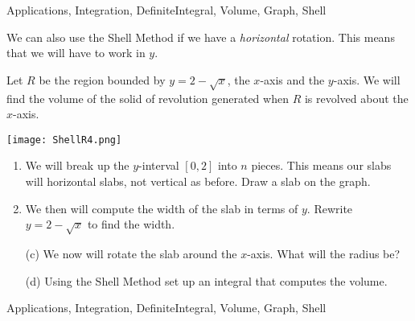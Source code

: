\begin{tagblock}{Applications, Integration, DefiniteIntegral, Volume, Graph, Shell}
\begin{question}
	


We can also use the Shell Method if we have a \emph{horizontal} rotation.  This means that we will have to work in $y$.
 
 \item Let $R$ be the region bounded by $y=2-\sqrt{x}$, the $x$-axis and the $y$-axis.  We will find the volume of the  solid of revolution generated when $R$ is revolved about the $x$-axis. 

\begin{minipage}{.4\textwidth} \texttt{[image: ShellR4.png]} \end{minipage}%
 \begin{minipage}{.6\textwidth}
\begin{enumerate}
\item We will break up the $y$-interval $[0,2]$ into $n$ pieces.  This means our slabs will horizontal slabs, not vertical as before.  Draw a slab on the graph.

\item  We then will compute the width of the slab in terms of $y$.  Rewrite $y=2-\sqrt{x}$ to find the width.  
 \end{enumerate}

\end{minipage}

\vspace{.5in}
\begin{enumerate}
\item[(c)] We now will rotate the slab around the $x$-axis.  What will the radius be?  
\vspace{.5in}

\item[(d)] Using the Shell Method set up an integral that computes the volume.   
 \end{enumerate}




    
\begin{tags}
       Applications, Integration, DefiniteIntegral, Volume, Graph, Shell
\end{tags}
    
\begin{diary}
        
\end{diary}
	
\begin{solution}

\end{solution}
	
\end{question}

\end{tagblock}

